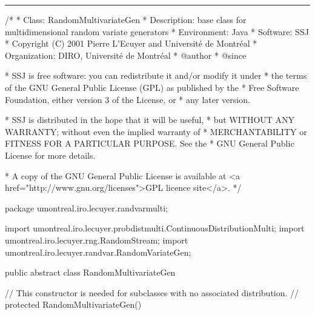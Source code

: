 \bigskip\hrule
\begin{code}
\begin{hide}
/*
 * Class:        RandomMultivariateGen
 * Description:  base class for multidimensional random variate generators
 * Environment:  Java
 * Software:     SSJ 
 * Copyright (C) 2001  Pierre L'Ecuyer and Université de Montréal
 * Organization: DIRO, Université de Montréal
 * @author       
 * @since

 * SSJ is free software: you can redistribute it and/or modify it under
 * the terms of the GNU General Public License (GPL) as published by the
 * Free Software Foundation, either version 3 of the License, or
 * any later version.

 * SSJ is distributed in the hope that it will be useful,
 * but WITHOUT ANY WARRANTY; without even the implied warranty of
 * MERCHANTABILITY or FITNESS FOR A PARTICULAR PURPOSE.  See the
 * GNU General Public License for more details.

 * A copy of the GNU General Public License is available at
   <a href="http://www.gnu.org/licenses">GPL licence site</a>.
 */
\end{hide}
package umontreal.iro.lecuyer.randvarmulti;\begin{hide}

import umontreal.iro.lecuyer.probdistmulti.ContinuousDistributionMulti;
import umontreal.iro.lecuyer.rng.RandomStream;
import umontreal.iro.lecuyer.randvar.RandomVariateGen;
\end{hide}


public abstract class RandomMultivariateGen \begin{hide} {
   protected int dimension;
   // Careful here: there is also a RandomStream inside gen1. But only one
   // of these two is used in a given class.
   protected RandomStream stream;  // stream used to generate random numbers
   protected RandomVariateGen gen1; // 1-dim generator used to generate random variates
\end{hide}\end{code}

\begin{hide}\begin{code}
// This constructor is needed for subclasses with no associated distribution.
//   protected RandomMultivariateGen() {}
\end{code}\end{hide}


